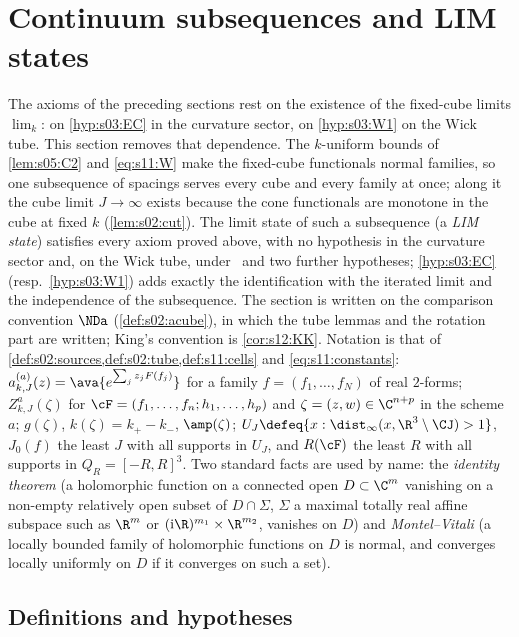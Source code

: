 \section{Continuum subsequences and LIM states}

The axioms of the preceding sections rest on the existence of the fixed-cube limits $\lim_k$: on \cref{hyp:s03:EC} in the curvature sector, on \cref{hyp:s03:W1} on the Wick tube. This section removes that dependence. The $k$-uniform bounds of \cref{lem:s05:C2} and \eqref{eq:s11:W} make the fixed-cube functionals normal families, so one subsequence of spacings serves every cube and every family at once; along it the cube limit $J\to\infty$ exists because the cone functionals are monotone in the cube at fixed $k$ (\cref{lem:s02:cut}). The limit state of such a subsequence (a \emph{LIM state}) satisfies every axiom proved above, with no hypothesis in the curvature sector and, on the Wick tube, under \Tthree\ and two further hypotheses; \cref{hyp:s03:EC} (resp.\ \cref{hyp:s03:W1}) adds exactly the identification with the iterated limit and the independence of the subsequence. The section is written on the comparison convention $\NDa$ (\cref{def:s02:acube}), in which the tube lemmas and the rotation part are written; King's convention is \cref{cor:s12:KK}. Notation is that of \cref{def:s02:sources,def:s02:tube,def:s11:cells} and \eqref{eq:s11:constants}: $a^{(a)}_{k,J}(z)=\ava{e^{\sum_jz_jF(f_j)}}$ for a family $f=(f_1,\dots,f_N)$ of real $2$-forms; $Z^a_{k,J}(\zeta)$ for $\cF=(f_1,\dots,f_n;h_1,\dots,h_p)$ and $\zeta=(z,w)\in\C^{n+p}$ in the scheme $a$; $g(\zeta)$, $k(\zeta)=k_+-k_-$, $\amp(\zeta)$; $U_J\defeq\{x:\dist_\infty(x,\R^3\setminus\CJ)>1\}$, $J_0(f)$ the least $J$ with all supports in $U_J$, and $R(\cF)$ the least $R$ with all supports in $Q_R=[-R,R]^3$. Two standard facts \cite{Hor90} are used by name: the \emph{identity theorem} (a holomorphic function on a connected open $D\subset\C^m$ vanishing on a non-empty relatively open subset of $D\cap\Sigma$, $\Sigma$ a maximal totally real affine subspace such as $\R^m$ or $(\mathrm i\R)^{m_1}\times\R^{m_2}$, vanishes on $D$) and \emph{Montel--Vitali} (a locally bounded family of holomorphic functions on $D$ is normal, and converges locally uniformly on $D$ if it converges on such a set).

\subsection{Definitions and hypotheses}

